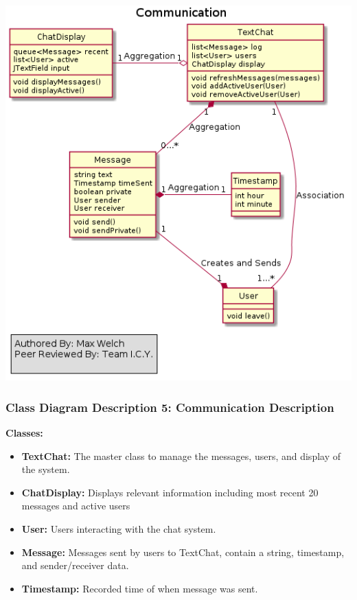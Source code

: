 \documentclass[twoside,letterpaper]{article}
\begin{document}
	\includegraphics[width=6.0in]{images/ClassDiagrams/Communication}
	
	\newpage
	\subsubsection[Class Diagram Description 5: Communication Description]{\rmfamily\bfseries\color{black}
		Class Diagram Description 5: Communication Description}
	\hypertarget{RefHeading22059017292}{}
	
	\textbf{Classes:}
	\begin{itemize}
	
		\item \textbf{TextChat:} The master class to manage the messages, users, and display of the system.
		\item \textbf{ChatDisplay:} Displays relevant information including most recent 20 messages and active users
		\item \textbf{User:} Users interacting with the chat system.
		\item \textbf{Message:} Messages sent by users to TextChat, contain a string, timestamp, and sender/receiver data.
		\item \textbf{Timestamp:} Recorded time of when message was sent.
	\end{itemize}
	\newpage
	
\end{document}
